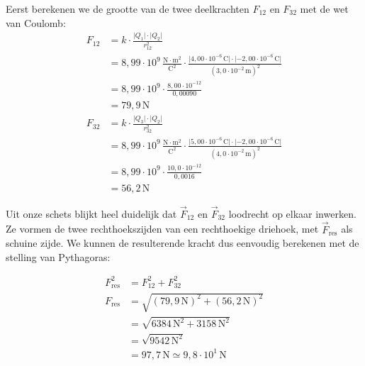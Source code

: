 \documentclass{ximera}
\begin{document}
\begin{example}[foldable=true,title={Voorbeeld: loodrechte krachten in een driehoek}]
\begin{solution}
        Eerst berekenen we de grootte van de twee deelkrachten $F_{12}$ en $F_{32}$ met de wet van Coulomb:
        \begin{align*}
            F_{12} &= k \cdot \frac{\lvert Q_{1}\rvert \cdot \lvert Q_{2}\rvert}{r^{2}_{12}} \\
            &= 8{,}99 \cdot 10^9 \, \mathrm{\frac{N\cdot m^2}{C^2}} \cdot \frac{\lvert 4{,}00 \cdot 10^{-6} \, \mathrm{C} \rvert \cdot \lvert -2{,}00 \cdot 10^{-6} \, \mathrm{C}\rvert}{(3{,}0 \cdot 10^{-2} \, \mathrm{m})^{2}} \\
            &= 8{,}99 \cdot 10^9 \cdot \frac{8{,}00 \cdot 10^{-12}}{0{,}00090} \\
            &= 79{,}9 \, \mathrm{N}
        \end{align*}    
        \begin{align*}
            F_{32} &= k \cdot \frac{\lvert Q_{3}\rvert \cdot \lvert Q_{2}\rvert}{r^{2}_{32}} \\
            &= 8{,}99 \cdot 10^9 \, \mathrm{\frac{N\cdot m^2}{C^2}} \cdot \frac{\lvert 5{,}00 \cdot 10^{-6} \, \mathrm{C}\rvert \cdot \lvert -2{,}00 \cdot 10^{-6} \, \mathrm{C}\rvert}{(4{,}0 \cdot 10^{-2} \, \mathrm{m})^{2}} \\
            &= 8{,}99 \cdot 10^9 \cdot \frac{10{,}0 \cdot 10^{-12}}{0{,}0016} \\
            &= 56{,}2 \, \mathrm{N}
        \end{align*}    
        
        Uit onze schets blijkt heel duidelijk dat $\vec{F}_{12}$ en $\vec{F}_{32}$ loodrecht op elkaar inwerken. Ze vormen de twee rechthoekszijden van een rechthoekige driehoek, met $\vec{F}_{\text{res}}$ als schuine zijde. We kunnen de resulterende kracht dus eenvoudig berekenen met de stelling van Pythagoras:
        
        \begin{align*}
            F^{2}_{\text{res}} &= F^{2}_{12} + F^{2}_{32} \\
            F_{\text{res}} &= \sqrt{(79{,}9 \, \mathrm{N})^{2} + (56{,}2 \, \mathrm{N})^{2}} \\
            &= \sqrt{6384 \, \mathrm{N}^2 + 3158 \, \mathrm{N}^2} \\
            &= \sqrt{9542 \, \mathrm{N}^2} \\
            &= 97{,}7 \, \mathrm{N} \simeq \boxed{9{,}8 \cdot 10^{1} \, \mathrm{N}}
        \end{align*}
        
    \end{solution}
\end{example}
\end{document}
